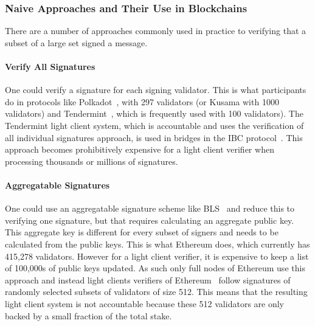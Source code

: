 \subsubsection{Naive Approaches and Their Use in Blockchains}
There are a number of approaches commonly used in practice to verifying that a subset of a large set signed a message.
\vspace{-0.2cm}
\noindent \paragraph{Verify All Signatures}  One could verify a signature for each signing validator. This is what participants  do in protocols like Polkadot~\cite{polkadot}, with 297 validators
(or Kusama with 1000 validators) %
and Tendermint~\cite{tendermint_paper}, which is frequently used with 100 validators). %
The Tendermint light client system, which is accountable and uses the verification of all individual signatures approach,
is used in bridges in the IBC protocol~\cite{IBC_paper}. This approach becomes prohibitively expensive for a light client verifier when processing thousands or millions of signatures.
\vspace{-0.1in}
\noindent \paragraph{Aggregatable Signatures} One could use an aggregatable signature scheme like BLS~\cite{BLS_signatures,boneh_compact_multisig}  and reduce this to verifying one signature, but that requires calculating an aggregate public key. This aggregate key is different for every subset of signers and needs to be calculated from the public keys. This is what Ethereum
does, which currently has 415,278 validators. %
However for a light client verifier, it is expensive to keep a list of 100,000s of public keys updated. As such only full nodes of Ethereum use this approach and instead light clients verifiers of Ethereum~\cite{sync_committee} follow signatures of randomly selected subsets of validators of size 512. This means that the resulting light client system is not accountable because these 512 validators are only backed by a small fraction of the total stake.
\vspace{-0.2cm}
